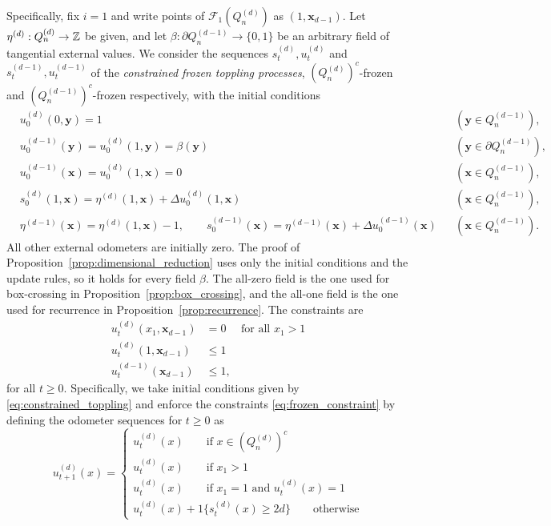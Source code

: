 \documentclass[12pt]{amsart}
\begin{document}
Specifically, fix $i=1$ and write points of $\mathcal F_1(Q_n^{(d)})$ as $(1,\mathbf x_{d-1})$. Let $\eta^{(d)}:Q_n^{(d)}\to\mathbb{Z}$ be given, and let $\beta:\partial Q_n^{(d-1)}\to\{0,1\}$ be an arbitrary field of tangential external values. We consider the sequences $s_t^{(d)},u_t^{(d)}$ and $s_t^{(d-1)},u_t^{(d-1)}$ of the \emph{constrained frozen toppling processes}, $(Q_n^{(d)})^c$-frozen and $(Q_n^{(d-1)})^c$-frozen respectively, with the initial conditions
\begin{equation}\label{eq:constrained_toppling}
\begin{aligned}
&u_0^{(d)}(0,\mathbf y)=1
  &&(\mathbf y\in Q_n^{(d-1)}),\\
&u_0^{(d-1)}(\mathbf y)=u_0^{(d)}(1,\mathbf y)=\beta(\mathbf y)
  &&(\mathbf y\in\partial Q_n^{(d-1)}),\\
&u_0^{(d-1)}(\mathbf x)=u_0^{(d)}(1,\mathbf x)=0
  &&(\mathbf x\in Q_n^{(d-1)}),\\
&s_0^{(d)}(1,\mathbf x)=\eta^{(d)}(1,\mathbf x)
  +\Delta u_0^{(d)}(1,\mathbf x)
  &&(\mathbf x\in Q_n^{(d-1)}),\\
&\eta^{(d-1)}(\mathbf x)=\eta^{(d)}(1,\mathbf x)-1,\qquad
 s_0^{(d-1)}(\mathbf x)=\eta^{(d-1)}(\mathbf x)
  +\Delta u_0^{(d-1)}(\mathbf x)
  &&(\mathbf x\in Q_n^{(d-1)}).
\end{aligned}
\end{equation}
All other external odometers are initially zero. The proof of Proposition~\ref{prop:dimensional_reduction} uses only the initial conditions and the update rules, so it holds for every field $\beta$. The all-zero field is the one used for box-crossing in Proposition~\ref{prop:box_crossing}, and the all-one field is the one used for recurrence in Proposition~\ref{prop:recurrence}.
The constraints are
\begin{equation} \label{eq:frozen_constraint}
\begin{aligned}
u_t^{(d)}(x_1,\mathbf{x}_{d-1}) &= 0 \quad \mbox{ for all $x_1 > 1$} \\
u_t^{(d)}(1, \mathbf{x}_{d-1}) & \leq 1 \\
u_t^{(d-1)}(\mathbf{x}_{d-1}) &\leq 1,
\end{aligned}
\end{equation}
for all $t \geq 0$. Specifically, we take initial conditions given by \eqref{eq:constrained_toppling}
and enforce the constraints \eqref{eq:frozen_constraint} by defining the odometer sequences for $t \geq 0$ as
\[
u_{t+1}^{(d)}(x) = 
\begin{cases}
u_t^{(d)}(x) \qquad \mbox{if $x \in (Q_n^{(d)})^c$} \\
u_t^{(d)}(x) \qquad \mbox{if $x_1 > 1$} \\
u_t^{(d)}(x) \qquad \mbox{if $x_1 = 1$ and $u_t^{(d)}(x)  = 1$} \\
u_t^{(d)}(x) + 1\{s_t^{(d)}(x) \geq 2 d\} \qquad \mbox{otherwise}
\end{cases}
\]
\end{document}
